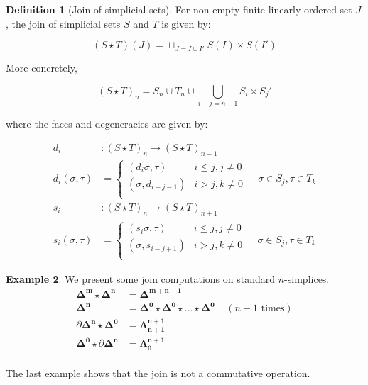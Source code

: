 \documentclass[10pt]{amsart}
\newcommand{\8}{\ensuremath{\infty}}
\newcommand{\0}{\ensuremath{\overset{\rightarrow}{0}}}
\newcommand{\1}{\ensuremath{\mathbf{1}}}
\newcommand{\Simplex}[1]{\ensuremath{\boldsymbol{\Delta^{#1}}}}
\newcommand{\Horn}[2]{\ensuremath{\boldsymbol{\Lambda^{#1}_{#2}}}}
\theoremstyle{definition}
\newtheorem{definition}{Definition}[section]
\newtheorem{example}[definition]{Example}
\numberwithin{definition}{subsection}
\numberwithin{definition}{section}
\begin{document}
\begin{definition}[Join of simplicial sets\label{def:ssetjoin}]
  For non-empty finite linearly-ordered set $J$, the join of simplicial sets $S$ and $T$ is given by:

  \begin{equation*}
    (S \star T)(J) = \sqcup_{J = I \cup I'} S(I) \times S(I')
  \end{equation*}

  More concretely,

  \begin{equation*}
    (S \star T)_n = S_n \cup T_n \cup \bigcup_{i + j = n - 1} S_i \times S_j'
  \end{equation*}

  where the faces and degeneracies are given by:

  \begin{align*}
    d_i               & : (S \star T)_n \rightarrow (S \star T)_{n - 1} \\
    d_i(\sigma, \tau) & =
    \begin{cases}
      (d_i \sigma, \tau)      & i \leq j, j \neq 0 \\
      (\sigma, d_{i - j - 1}) & i > j, k \neq 0    \\
    \end{cases} \;\;\;\; \sigma \in S_j, \tau \in T_k   \\
    s_i               & : (S \star T)_n \rightarrow (S \star T)_{n + 1} \\
    s_i(\sigma, \tau) & =
    \begin{cases}
      (s_i \sigma, \tau)      & i \leq j, j \neq 0 \\
      (\sigma, s_{i - j + 1}) & i > j, k \neq 0    \\
    \end{cases} \;\;\;\; \sigma \in S_j, \tau \in T_k
  \end{align*}
\end{definition}

\begin{example}
  We present some join computations on standard $n$-simplices.
  \begin{align*}
    \Simplex{m} \star \Simplex{n}          & = \Simplex{m + n + 1}                                                                         \\
    \Simplex{n}                            & = \Simplex{0} \star \Simplex{0} \star \ldots \star \Simplex{0} \;\;\;\; (n + 1 \text{ times}) \\
    \partial \Simplex{n} \star \Simplex{0} & = \Horn{n + 1}{n + 1}                                                                         \\
    \Simplex{0} \star \partial \Simplex{n} & = \Horn{n + 1}{0}                                                                             \\
  \end{align*}

  The last example shows that the join is not a commutative operation.
\end{example}
\end{document}
